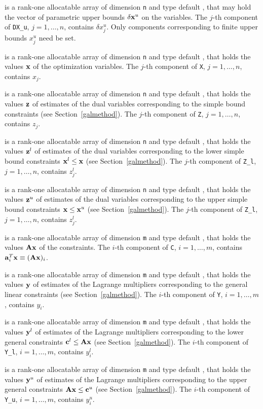 \documentclass{galahad}
\begin{document}
\begin{description}
 is a rank-one allocatable array of dimension {\tt n} and type
default \realdp, that may hold the vector of parametric upper bounds
$\delta {\mathbf{x}}^{u}$  on the variables. The $j$-th component of
{\tt DX\_u}, $j = 1,  \ldots ,  n$, contains $\delta x_{j}^{u}$.
Only components corresponding to finite upper bounds $x_{j}^{u}$
need be set.

 is a rank-one allocatable array of dimension {\tt n} and type
default \realdp,
that holds the values ${\mathbf{x}}$ of the optimization variables.
The $j$-th component of {\tt X}, $j = 1,  \ldots , n$, contains $x_{j}$.

 is a rank-one allocatable array of dimension {\tt n} and type default
\realdp, that holds
the values ${\mathbf{z}}$ of estimates  of the dual variables
corresponding to the simple bound constraints (see Section~\ref{galmethod}).
The $j$-th component of {\tt Z}, $j = 1,  \ldots ,  n$, contains $z_{j}$.

 is a rank-one allocatable array of dimension {\tt n} and type default
\realdp, that holds
the values ${\mathbf{z}}^{l}$ of estimates  of the dual variables
corresponding to the lower simple bound constraints ${\mathbf{x}}^{l} \leq {\mathbf{x}}$
(see Section~\ref{galmethod}).
The $j$-th component of {\tt Z\_l}, $j = 1,  \ldots ,  n$,
contains $z_{j}^{l}$.

 is a rank-one allocatable array of dimension {\tt n} and type default
\realdp, that holds
the values ${\mathbf{z}}^{u}$ of estimates  of the dual variables
corresponding to the upper simple bound constraints ${\mathbf{x}} \leq {\mathbf{x}}^{u}$
(see Section~\ref{galmethod}).
The $j$-th component of {\tt Z\_l}, $j = 1,  \ldots ,  n$,
contains $z_{j}^{l}$.

 is a rank-one allocatable array of dimension {\tt m} and type default
\realdp, that holds
the values ${\mathbf{A}} {\mathbf{x}}$ of the constraints.
The $i$-th component of {\tt C}, $i = 1,  \ldots ,  m$, contains
${\mathbf{a}}_{i}^{T}{\mathbf{x}} \equiv ({\mathbf{A}} {\mathbf{x}})_{i}$.

 is a rank-one allocatable array of dimension {\tt m} and type
default \realdp, that holds
the values ${\mathbf{y}}$ of estimates  of the Lagrange multipliers
corresponding to the general linear constraints (see Section~\ref{galmethod}).
The $i$-th component of {\tt Y}, $i = 1,  \ldots ,  m$, contains $y_{i}$.

 is a rank-one allocatable array of dimension {\tt m} and
type default \realdp, that holds
the values ${\mathbf{y}}^{l}$ of estimates  of the Lagrange multipliers
corresponding to the lower general constraints ${\mathbf{c}}^{l} \leq {\mathbf{A}} {\mathbf{x}}$
(see Section~\ref{galmethod}).
The $i$-th component of {\tt Y\_l}, $i = 1,  \ldots ,  m$,
contains $y_{i}^{l}$.

 is a rank-one allocatable array of dimension {\tt m} and
type default \realdp, that holds
the values ${\mathbf{y}}^{u}$ of estimates  of the Lagrange multipliers
corresponding to the upper general constraints ${\mathbf{A}} {\mathbf{x}} \leq {\mathbf{c}}^{u}$
(see Section~\ref{galmethod}).
The $i$-th component of {\tt Y\_u}, $i = 1,  \ldots ,  m$,
contains $y_{i}^{u}$.

\end{description}
\end{document}
